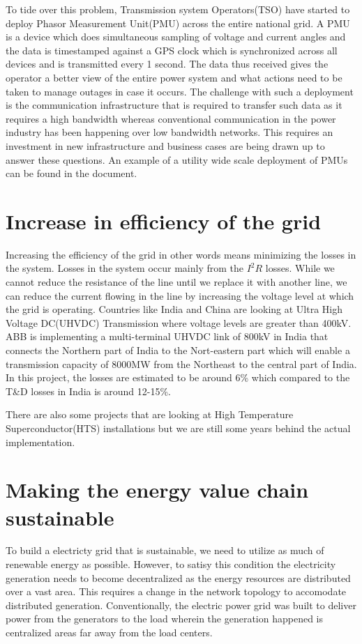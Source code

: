 \documentclass[11pt,a4paper]{article}
\begin{document}
To tide over this problem, Transmission system Operators(TSO) have started to deploy Phasor Measurement Unit(PMU) across the entire national grid. A PMU is a device which does simultaneous sampling of voltage and current angles and the data is timestamped against a GPS clock which is synchronized across all devices and is transmitted every 1 second. The data thus received gives the operator a better view of the entire power system and what actions need to be taken to manage outages in case it occurs\cite{pmusitu2010}. The challenge with such a deployment is the communication infrastructure that is required to transfer such data as it requires a high bandwidth whereas conventional communication in the power industry has been happening over low bandwidth networks. This requires an investment in new infrastructure and business cases are being drawn up to answer these questions. An example of a utility wide scale deployment of PMUs can be found in the document\cite{usoutage2004}.

\section{Increase in efficiency of the grid}
Increasing the efficiency of the grid in other words means minimizing the losses in the system. Losses in the system occur mainly from the $I^{2}R$ losses. While we cannot reduce the resistance of the line until we replace it with another line, we can reduce the current flowing in the line by increasing the voltage level at which the grid is operating. Countries like India and China are looking at Ultra High Voltage DC(UHVDC) Transmission where voltage levels are greater than 400kV. ABB is implementing a multi-terminal UHVDC link of 800kV in India that connects the Northern part of India to the Nort-eastern part which will enable a transmission capacity of 8000MW from the Northeast to the central part of India\cite{abbhvdc2014}. In this project, the losses are estimated to be around 6\% which compared to the T\&D losses in India is around 12-15\%.

There are also some projects that are looking at High Temperature Superconductor(HTS) installations but we are still some years behind the actual implementation.

\section{Making the energy value chain sustainable}
To build a electricty grid that is sustainable, we need to utilize as much of renewable energy as possible. However, to satisy this condition the electricity generation needs to become decentralized as the energy resources are distributed over a vast area. This requires a change in the network topology to accomodate distributed generation. Conventionally, the electric power grid was built to deliver power from the generators to the load wherein the generation happened is centralized areas far away from the load centers.
\end{document}
